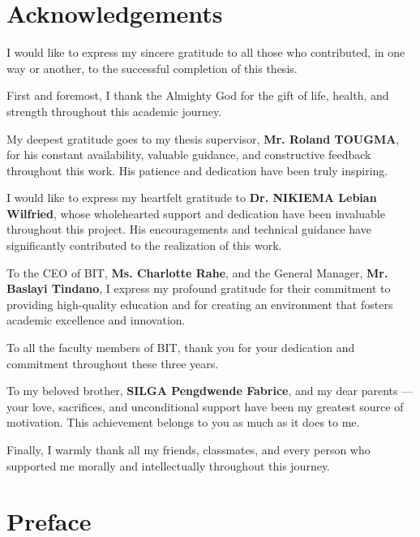 \documentclass[a4paper,12pt,oneside]{report}
\begin{document}
\section*{Acknowledgements}
\vspace{0.5cm}
\justifying

I would like to express my sincere gratitude to all those who contributed, in one
way or another, to the successful completion of this thesis.

First and foremost, I thank the Almighty God for the gift of life, health, and
strength throughout this academic journey.

My deepest gratitude goes to my thesis supervisor, \textbf{Mr. Roland TOUGMA},
for his constant availability, valuable guidance, and constructive feedback
throughout this work. His patience and dedication have been truly inspiring.

I would like to express my heartfelt gratitude to \textbf{Dr. NIKIEMA Lebian
Wilfried}, whose wholehearted support and dedication have been invaluable
throughout this project. His encouragements and technical guidance have
significantly contributed to the realization of this work.

To the CEO of BIT, \textbf{Ms. Charlotte Rahe}, and the General Manager,
\textbf{Mr. Baslayi Tindano}, I express my profound gratitude for their
commitment to providing high-quality education and for creating an environment
that fosters academic excellence and innovation.

To all the faculty members of BIT, thank you for your dedication and commitment
throughout these three years.

To my beloved brother, \textbf{SILGA Pengdwende Fabrice}, and my dear parents ---
your love, sacrifices, and unconditional support have been my greatest source of
motivation. This achievement belongs to you as much as it does to me.

Finally, I warmly thank all my friends, classmates, and every person who supported
me morally and intellectually throughout this journey.
\clearpage

\section*{Preface}
\justifying
\end{document}
